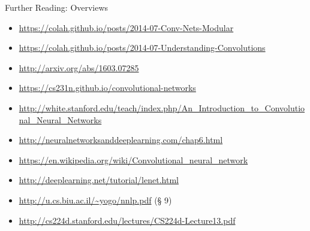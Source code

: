 \documentclass[xcolor=pdftex,x11names,table,hyperref]{beamer}
\begin{document}
\begin{frame}{Further Reading: Overviews}
\begin{tiny}
\begin{itemize}
	\item \url{https://colah.github.io/posts/2014-07-Conv-Nets-Modular}
	\item \url{https://colah.github.io/posts/2014-07-Understanding-Convolutions}
	\item \url{http://arxiv.org/abs/1603.07285}
	\item \url{https://cs231n.github.io/convolutional-networks}
	\item \url{http://white.stanford.edu/teach/index.php/An_Introduction_to_Convolutional_Neural_Networks}
	\item \url{http://neuralnetworksanddeeplearning.com/chap6.html}
	\item \url{https://en.wikipedia.org/wiki/Convolutional_neural_network}
	\item \url{http://deeplearning.net/tutorial/lenet.html}
	\item \url{http://u.cs.biu.ac.il/~yogo/nnlp.pdf} (\S{} 9)
	\item \url{http://cs224d.stanford.edu/lectures/CS224d-Lecture13.pdf}
\end{itemize}
\end{tiny}
\end{frame}
\end{document}
